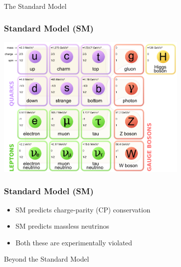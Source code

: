 \documentclass[xcolor=table]{beamer}
\begin{document}

\begin{frame}

\begin{center}
{\Huge The Standard Model}
\end{center}

\end{frame}


\begin{frame}
\frametitle{Standard Model (SM)}

\begin{center}
\includegraphics[width=0.7\textwidth]{images/standard-model.png}
\end{center}


\end{frame}



\begin{frame}
\frametitle{Standard Model (SM)}

\begin{itemize}
\item SM predicts charge-parity (CP) conservation
\item SM predicts massless neutrinos
\item Both these are experimentally violated
\end{itemize}

\end{frame}




\begin{frame}

\begin{center}
{\Huge Beyond the Standard Model}
\end{center}

\end{frame}
\end{document}
